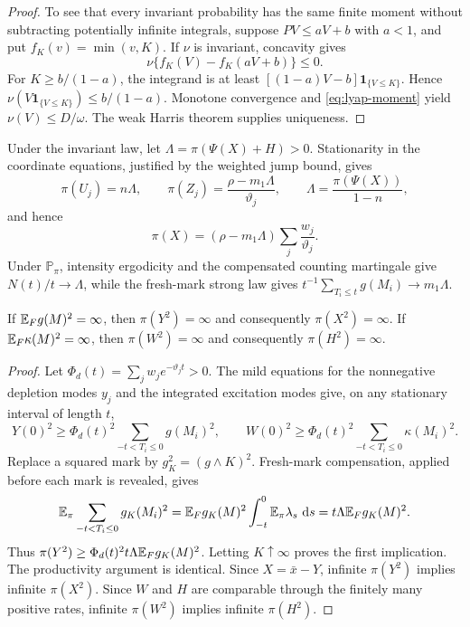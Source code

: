 \begin{proof}
To see that every invariant probability has the same finite moment without subtracting potentially infinite integrals, suppose \(PV\leq aV+b\) with \(a<1\), and put \(f_K(v)=\min(v,K)\). If \(\nu\) is invariant, concavity gives
\[
\nu\{f_K(V)-f_K(aV+b)\}\leq0.
\]
For \(K\geq b/(1-a)\), the integrand is at least
\([(1-a)V-b]\mathbf 1_{\{V\leq K\}}\). Hence
\(\nu(V\mathbf 1_{\{V\leq K\}})\leq b/(1-a)\). Monotone convergence and \eqref{eq:lyap-moment} yield \(\nu(V)\leq D/\omega\). The weak Harris theorem supplies uniqueness.
\end{proof}

Under the invariant law, let \(\Lambda=\pi(\Psi(X)+H)>0\). Stationarity in the coordinate equations, justified by the weighted jump bound, gives
\[
\pi(U_j)=n\Lambda,\qquad
\pi(Z_j)=\frac{\rho-m_1\Lambda}{\vartheta_j},\qquad
\Lambda=\frac{\pi(\Psi(X))}{1-n},
\]
and hence
\[
\pi(X)=(\rho-m_1\Lambda)\sum_j\frac{w_j}{\vartheta_j}.
\]
Under \(\mathbb P_\pi\), intensity ergodicity and the compensated counting martingale give \(N(t)/t\to\Lambda\), while the fresh-mark strong law gives \(t^{-1}\sum_{T_i\leq t}g(M_i)\to m_1\Lambda\).

\begin{proposition}\label{prop:heavy-moments}
If \(\mathbb{E} _Fg(M)^2=\infty\), then \(\pi(Y^2)=\infty\) and consequently \(\pi(X^2)=\infty\). If \(\mathbb{E} _F\kappa(M)^2=\infty\), then \(\pi(W^2)=\infty\) and consequently \(\pi(H^2)=\infty\).
\end{proposition}

\begin{proof}
Let \(\Phi_d(t)=\sum_jw_je^{-\vartheta_jt}>0\). The mild equations for the nonnegative depletion modes \(y_j\) and the integrated excitation modes give, on any stationary interval of length \(t\),
\[
Y(0)^2\geq\Phi_d(t)^2\sum_{-t<T_i\leq0}g(M_i)^2,
\qquad
W(0)^2\geq\Phi_d(t)^2\sum_{-t<T_i\leq0}\kappa(M_i)^2.
\]
Replace a squared mark by \(g_K^2=(g\wedge K)^2\). Fresh-mark compensation, applied before each mark is revealed, gives
\[
\mathbb{E} _\pi\sum_{-t<T_i\leq0}g_K(M_i)^2
=\mathbb{E} _Fg_K(M)^2\int_{-t}^0\mathbb{E} _\pi\lambda_s\,\mathop{}\!\mathrm{d} s
=t\Lambda\mathbb{E} _Fg_K(M)^2.
\]
Thus
\(\pi(Y^2)\geq\Phi_d(t)^2t\Lambda\mathbb{E} _Fg_K(M)^2\).
Letting \(K\uparrow\infty\) proves the first implication. The productivity argument is identical. Since \(X=\bar x-Y\), infinite \(\pi(Y^2)\) implies infinite \(\pi(X^2)\). Since \(W\) and \(H\) are comparable through the finitely many positive rates, infinite \(\pi(W^2)\) implies infinite \(\pi(H^2)\).
\end{proof}


